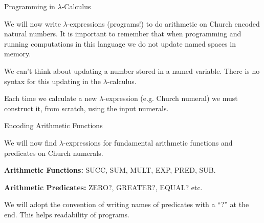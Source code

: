 \documentclass{beamer}
\begin{document}
\begin{frame}{Programming in $\lambda$-Calculus}

  We will now write $\lambda$-expressions (programs!) to do arithmetic on Church encoded natural numbers. It is important to remember that when programming and running computations in this language we do not update named spaces in memory. 
  
  \vspace{0.5cm}
  
  We can't think about updating a number stored in a named variable. There is no syntax for this updating in the $\lambda$-calculus.
  
  \vspace{0.5cm}
  
  Each time we calculate a new $\lambda$-expression (e.g. Church numeral) we must construct it, from scratch, using the input numerals. 
  
\end{frame}

\begin{frame}{Encoding Arithmetic Functions}

  We will now find $\lambda$-expressions for fundamental arithmetic functions and predicates on Church numerals.
  
  {\bf Arithmetic Functions: } SUCC, SUM, MULT, EXP, PRED, SUB.

  \vspace{1cm}  
  
  {\bf Arithmetic Predicates:} ZERO?, GREATER?, EQUAL? etc.

  \vspace{2cm}

  We will adopt the convention of writing names of predicates with a ``?'' at the end. This helps readability of programs. 
  
\end{frame}
\end{document}
